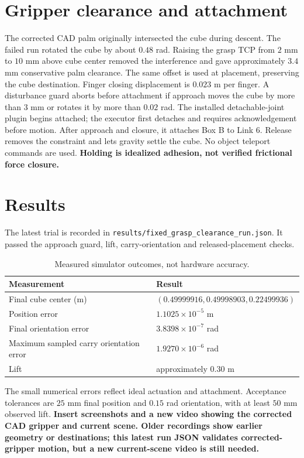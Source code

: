 \documentclass[11pt,a4paper]{article}
\begin{document}
\section{Gripper clearance and attachment}
The corrected CAD palm originally intersected the cube during descent. The failed run rotated the cube by about $0.48$ rad. Raising the grasp TCP from $2$ mm to $10$ mm above cube center removed the interference and gave approximately $3.4$ mm conservative palm clearance. The same offset is used at placement, preserving the cube destination. Finger closing displacement is $0.023$ m per finger.
A disturbance guard aborts before attachment if approach moves the cube by more than $3$ mm or rotates it by more than $0.02$ rad. The installed detachable-joint plugin begins attached; the executor first detaches and requires acknowledgement before motion. After approach and closure, it attaches Box B to Link 6. Release removes the constraint and lets gravity settle the cube. No object teleport commands are used. \textbf{Holding is idealized adhesion, not verified frictional force closure.}
\section{Results}
The latest trial is recorded in \texttt{results/fixed\_grasp\_clearance\_run.json}. It passed the approach guard, lift, carry-orientation and released-placement checks.
\begin{table}[h]\centering\begin{tabular}{ll}\toprule Measurement & Result\\\midrule
Final cube center (m)&$(0.49999916,0.49998903,0.22499936)$\\
Position error&$1.1025\times10^{-5}$ m\\
Final orientation error&$3.8398\times10^{-7}$ rad\\
Maximum sampled carry orientation error&$1.9270\times10^{-6}$ rad\\
Lift&approximately $0.30$ m\\\bottomrule\end{tabular}\caption{Measured simulator outcomes, not hardware accuracy.}\end{table}
The small numerical errors reflect ideal actuation and attachment. Acceptance tolerances are $25$ mm final position and $0.15$ rad orientation, with at least $50$ mm observed lift. \textbf{Insert screenshots and a new video showing the corrected CAD gripper and current scene. Older recordings show earlier geometry or destinations; this latest run JSON validates corrected-gripper motion, but a new current-scene video is still needed.}
\end{document}

